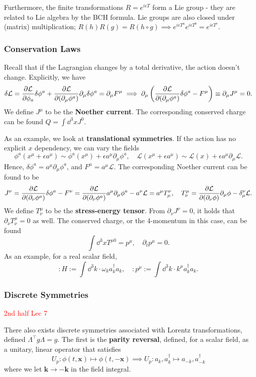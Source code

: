 \documentclass{article}
\begin{document}
Furthermore, the finite transformations $R=e^{i\epsilon T}$ form a Lie group - they are related to Lie algebra by the BCH formula. Lie groups are also closed under (matrix) multiplication; $R(h)R(g)=R(h\circ g)\implies e^{i\epsilon T^a}e^{i\epsilon T^b}=e^{i\epsilon T^c}$. 

\subsubsection{Conservation Laws}
Recall that if the Lagrangian changes by a total derivative, the action doesn't change. Explicitly, we have 
$$\delta\mathcal L= \frac{\partial \mathcal L}{\partial \phi_a}\delta\phi^a+ \frac{\partial \mathcal L}{\partial (\partial_\mu\phi^a)}\partial_\mu\delta\phi^a=\partial_\mu F^\mu\implies\partial_\mu\left( \frac{\partial \mathcal L}{\partial (\partial_\mu\phi^a)}\delta\phi^a-F^\mu\right)\equiv \partial_\mu J^\mu=0.$$
We define $J^\mu$ to be the \textbf{Noether current}. The corresponding conserved charge can be found $Q=\int\dd^3xJ^0$.

As an example, we look at \textbf{translational symmetries}. If the action has no explicit $x$ dependency, we can vary the fields 
$$\phi^a(x^\mu+\epsilon a^\mu)\sim \phi^a(x^\mu)+\epsilon a^\mu\partial_\mu\phi^a,\quad \mathcal L(x^\mu+\epsilon a^\mu)\sim\mathcal L(x)+\epsilon a^\mu\partial_\mu\mathcal L.$$
Hence, $\delta\phi^a=a^\mu\partial_\mu\phi^a$, and $F^\mu=a^\mu\mathcal L$. The corresponding Noether current can be found to be 
$$J^\nu= \frac{\partial \mathcal L}{\partial (\partial_\nu\phi^a)}\delta\phi^a-F^\nu= \frac{\partial \mathcal L}{\partial (\partial_\nu\phi^a)}a^\mu\partial_\mu\phi^a-a^\nu\mathcal L=a^\mu T_\mu^\nu,\quad T^\mu_\nu= \frac{\partial \mathcal L}{\partial (\partial_\nu\phi)}\partial_\mu\phi-\delta^\nu_\mu\mathcal L.$$
We define $T^\mu_\nu$ to be the \textbf{stress-energy tensor}. From $\partial_\nu J^\nu=0$, it holds that $\partial_\nu T^\mu_\nu=0$ as well. The conserved charge, or the 4-momentum in this case, can be found 
$$\int\dd^3x T^{\mu 0}=p^\mu,\quad\partial_tp^\mu=0.$$
As an example, for a real scalar field, 
$$:H:=\int\dd^3k\cdot \omega_ka^\dag_k a_k,\quad :p^\mu:=\int\dd^3k\cdot k^\mu a^\dag_ka_k.$$

\subsubsection{Discrete Symmetries}
\textcolor{red}{2nd half Lec 7}

There also exists discrete symmetries associated with Lorentz transformations, defined $\Lambda^\intercal g\Lambda=g$. The first is the \textbf{parity reversal}, defined, for a scalar field, as a unitary, linear operator that satisfies
$$U_p:\phi(t,\mathbf x)\mapsto\phi(t,-\mathbf x)\implies U_p:a_k,a^\dag_k\mapsto a_{-k},a^\dag_{-k}$$
where we let $\mathbf k\to-\mathbf k$ in the field integral.
\end{document}

